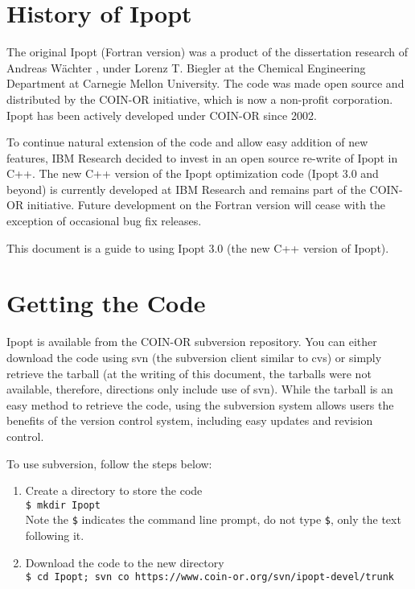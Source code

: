 \documentclass[letter,10pt]{article}
\begin{document}
\section{History of Ipopt}
The original Ipopt (Fortran version) was a product of the dissertation
research of Andreas W\"achter \cite{AndreasThesis}, under Lorenz
T. Biegler at the Chemical Engineering Department at Carnegie Mellon
University. The code was made open source and distributed by the
COIN-OR initiative, which is now a non-profit corporation.  Ipopt has
been actively developed under COIN-OR since 2002.

To continue natural extension of the code and allow easy addition of
new features, IBM Research decided to invest in an open source
re-write of Ipopt in C++.  The new C++ version of the Ipopt
optimization code (Ipopt 3.0 and beyond) is currently developed at IBM
Research and remains part of the COIN-OR initiative. Future
development on the Fortran version will cease with the exception of
occasional bug fix releases.

This document is a guide to using Ipopt 3.0 (the new C++ version of Ipopt).


\section{Getting the Code}
Ipopt is available from the COIN-OR subversion repository. You can
either download the code using svn (the subversion client similar to
cvs) or simply retrieve the tarball (at the writing of this document,
the tarballs were not available, therefore, directions only include
use of svn).  While the tarball is an easy method to retrieve the
code, using the subversion system allows users the benefits of the
version control system, including easy updates and revision
control.

To use subversion, follow the steps below:
\begin{enumerate}
\item{Create a directory to store the code}\\
{\tt \$ mkdir Ipopt}\\ 
Note the {\tt \$} indicates the command line
prompt, do not type {\tt \$}, only the text following it.
\item{Download the code to the new directory}\\
{\tt \$ cd Ipopt; svn co https://www.coin-or.org/svn/ipopt-devel/trunk}
\end{enumerate}
\end{document}
